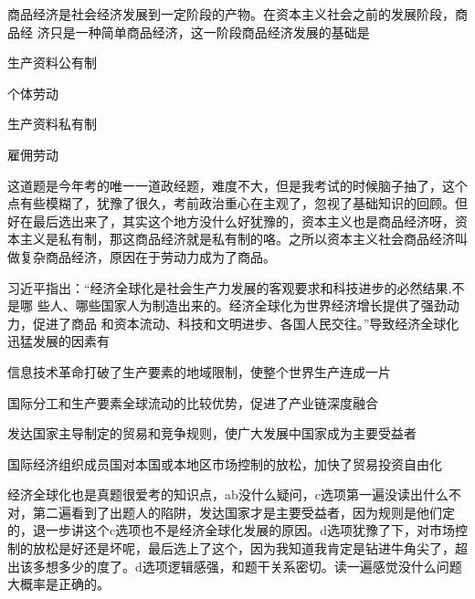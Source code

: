 \documentclass[lang=cn,blue,10pt,scheme=chinese,twocol]{zznote}
\begin{document}
\begin{exercise}商品经济是社会经济发展到一定阶段的产物。在资本主义社会之前的发展阶段，商品经 济只是一种简单商品经济，这一阶段商品经济发展的基础是
	\begin{choice}
		\item 生产资料公有制
		\item 个体劳动
		\item 生产资料私有制
		\item 雇佣劳动
	\end{choice}
\end{exercise}
\begin{solution}
	这道题是今年考的唯一一道政经题，难度不大，但是我考试的时候脑子抽了，这个点有些模糊了，犹豫了很久，考前政治重心在主观了，忽视了基础知识的回顾。但好在最后选出来了，其实这个地方没什么好犹豫的，资本主义也是商品经济呀，资本主义是私有制，那这商品经济就是私有制的咯。之所以资本主义社会商品经济叫做复杂商品经济，原因在于劳动力成为了商品。
\end{solution}

\begin{exercise}习近平指出：“经济全球化是社会生产力发展的客观要求和科技进步的必然结果,不是哪 些人、哪些国家人为制造出来的。经济全球化为世界经济增长提供了强劲动力，促进了商品 和资本流动、科技和文明进步、各国人民交往。”导致经济全球化迅猛发展的因素有
	\begin{choice}
		\item 信息技术革命打破了生产要素的地域限制，使整个世界生产连成一片
		\item 国际分工和生产要素全球流动的比较优势，促进了产业链深度融合
		\item 发达国家主导制定的贸易和竞争规则，使广大发展中国家成为主要受益者
		\item 国际经济组织成员国对本国或本地区市场控制的放松，加快了贸易投资自由化
	\end{choice}
\end{exercise}
\begin{solution}
	经济全球化也是真题很爱考的知识点，ab没什么疑问，c选项第一遍没读出什么不对，第二遍看到了出题人的陷阱，发达国家才是主要受益者，因为规则是他们定的，退一步讲这个c选项也不是经济全球化发展的原因。d选项犹豫了下，对市场控制的放松是好还是坏呢，最后选上了这个，因为我知道我肯定是钻进牛角尖了，超出该多想多少的度了。d选项逻辑感强，和题干关系密切。读一遍感觉没什么问题大概率是正确的。
\end{solution}
\end{document}
